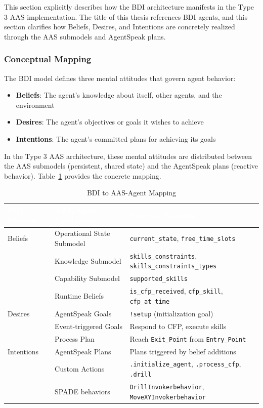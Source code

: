 This section explicitly describes how the \ac{BDI} architecture manifests in the Type 3 \ac{AAS} implementation. The title of this thesis references \ac{BDI} agents, and this section clarifies how Beliefs, Desires, and Intentions are concretely realized through the \ac{AAS} submodels and AgentSpeak plans.
\subsubsection{Conceptual Mapping}

The \ac{BDI} model defines three mental attitudes that govern agent behavior:
\begin{itemize}
    \item \textbf{Beliefs}: The agent's knowledge about itself, other agents, and the environment
    \item \textbf{Desires}: The agent's objectives or goals it wishes to achieve
    \item \textbf{Intentions}: The agent's committed plans for achieving its goals
\end{itemize}
In the Type 3 \ac{AAS} architecture, these mental attitudes are distributed between the \ac{AAS} submodels (persistent, shared state) and the AgentSpeak plans (reactive behavior). Table~\ref{tab:bdi_mapping} provides the concrete mapping.

\begin{table}[p]
\centering
\caption{BDI to AAS-Agent Mapping}
\label{tab:bdi_mapping}
\begin{tabular}{p{}p{}p{}}
\toprule
\rowcolor{headerblue}
\textcolor{white}{BDI Element} & \textcolor{white}{AAS/Agent Component} & \textcolor{white}{Concrete Example} \\
\midrule
Beliefs & Operational State Submodel & \texttt{current\_state}, \texttt{free\_time\_slots} \\
        & Knowledge Submodel & \texttt{skills\_constraints}, \texttt{skills\_constraints\_types} \\
        & Capability Submodel & \texttt{supported\_skills} \\
        & Runtime Beliefs & \texttt{is\_cfp\_received}, \texttt{cfp\_skill}, \texttt{cfp\_at\_time} \\
\midrule
\rowcolor{lightgray}
Desires & AgentSpeak Goals & \texttt{!setup} (initialization goal) \\
\rowcolor{lightgray}
        & Event-triggered Goals & Respond to CFP, execute skills \\
\rowcolor{lightgray}
        & Process Plan & Reach \texttt{Exit\_Point} from \texttt{Entry\_Point} \\
\midrule
Intentions & AgentSpeak Plans & Plans triggered by belief additions \\
           & Custom Actions & \texttt{.initialize\_agent}, \texttt{.process\_cfp}, \texttt{.drill} \\
           & SPADE behaviors & \texttt{DrillInvokerbehavior}, \texttt{MoveXYInvokerbehavior} \\
\bottomrule
\end{tabular}
\end{table}

